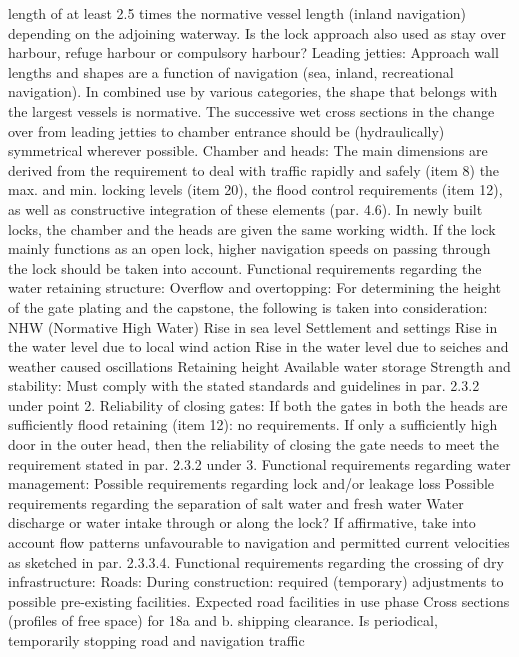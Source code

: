 length of at least 2.5 times the normative vessel length (inland
navigation) depending on the adjoining waterway.
Is the lock approach also used as stay over harbour, refuge harbour
or compulsory harbour?
Leading jetties:
Approach wall lengths and shapes are a function of navigation (sea,
inland, recreational navigation). In combined use by various categories,
the shape that belongs with the largest vessels is normative.
The successive wet cross sections in the change over from leading
jetties to chamber entrance should be (hydraulically) symmetrical
wherever possible.
Chamber and heads:
The main dimensions are derived from the requirement to deal with
traffic rapidly and safely (item 8) the max. and min. locking levels
(item 20), the flood control requirements (item 12), as well as constructive
integration of these elements (par. 4.6).
In newly built locks, the chamber and the heads are given the same
working width.
If the lock mainly functions as an open lock, higher navigation
speeds on passing through the lock should be taken into account.
Functional requirements regarding the water retaining structure:
Overflow and overtopping:
For determining the height of the gate plating and the capstone,
the following is taken into consideration:
NHW (Normative High Water)
Rise in sea level
Settlement and settings
Rise in the water level due to local wind action
Rise in the water level due to seiches and weather caused oscillations
Retaining height
Available water storage
Strength and stability:
Must comply with the stated standards and guidelines in par. 2.3.2
under point 2.
Reliability of closing gates:
If both the gates in both the heads are sufficiently flood retaining
(item 12): no requirements.
If only a sufficiently high door in the outer head, then the reliability
of closing the gate needs to meet the requirement stated in par.
2.3.2 under 3.
Functional requirements regarding water management:
Possible requirements regarding lock and/or leakage loss
Possible requirements regarding the separation of salt water and
fresh water
Water discharge or water intake through or along the lock? If affirmative,
take into account flow patterns unfavourable to navigation
and permitted current velocities as sketched in par. 2.3.3.4.
Functional requirements regarding the crossing of dry
infrastructure:
Roads:
During construction: required (temporary) adjustments to possible
pre-existing facilities.
Expected road facilities in use phase
Cross sections (profiles of free space) for 18a and b.
shipping clearance.
Is periodical, temporarily stopping road and navigation traffic
